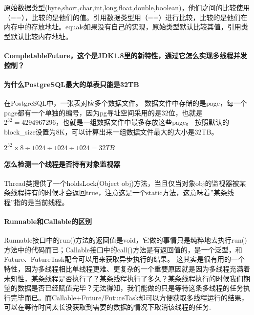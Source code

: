 \documentclass[../../../interview-questions.tex]{subfiles}
\begin{document}
原始数据类型(byte,short,char,int,long,float,double,boolean)，他们之间的比较使用（==），比较的是他们的值。引用数据类型用（==）进行比较，比较的是他们在内存中的存放地址。equals如果没有自己的实现，原始类型默认比较其值，引用类型默认比较内存地址。

\paragraph{CompletableFuture，这个是JDK1.8里的新特性，通过它怎么实现多线程并发控制？}

\paragraph{为什么PostgreSQL最大的单表只能是32TB}

在PostgreSQL中，一张表对应多个数据文件。
数据文件中存储的是page，每一个page都有一个单独的编号，因为pg寻址空间采用的是32位，也就是$2^{32}=4294967296$，也就是一组数据文件中最多存放这些page。
按照默认的block\_size设置为8K，可以计算出来一组数据文件最大的大小是32TB。


$2^{32} \times 8 \div 1024 \div 1024 \div 1024 = 32TB$

\paragraph{怎么检测一个线程是否持有对象监视器}

Thread类提供了一个holdsLock(Object obj)方法，当且仅当对象obj的监视器被某条线程持有的时候才会返回true，注意这是一个static方法，这意味着”某条线程”指的是当前线程。

\paragraph{Runnable和Callable的区别}

Runnable接口中的run()方法的返回值是void，它做的事情只是纯粹地去执行run()方法中的代码而已；Callable接口中的call()方法是有返回值的，是一个泛型，和Future、FutureTask配合可以用来获取异步执行的结果。
这其实是很有用的一个特性，因为多线程相比单线程更难、更复杂的一个重要原因就是因为多线程充满着未知性，某条线程是否执行了？某条线程执行了多久？某条线程执行的时候我们期望的数据是否已经赋值完毕？无法得知，我们能做的只是等待这条多线程的任务执行完毕而已。而Callable+Future/FutureTask却可以方便获取多线程运行的结果，可以在等待时间太长没获取到需要的数据的情况下取消该线程的任务.
\end{document}
